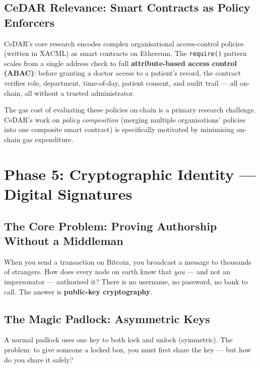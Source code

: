 \documentclass[12pt, a4paper]{article}
\begin{document}
\subsection{CeDAR Relevance: Smart Contracts as Policy Enforcers}

CeDAR's core research encodes complex organisational access-control policies
(written in XACML) as smart contracts on Ethereum. The \texttt{require()} pattern
scales from a single address check to full \textbf{attribute-based access control
(ABAC)}: before granting a doctor access to a patient's record, the contract
verifies role, department, time-of-day, patient consent, and audit trail ---
all on-chain, all without a trusted administrator.

The gas cost of evaluating these policies on-chain is a primary research
challenge. CeDAR's work on \emph{policy composition} (merging multiple
organisations' policies into one composite smart contract) is specifically
motivated by minimising on-chain gas expenditure.

\section{Phase 5: Cryptographic Identity --- Digital Signatures}

\subsection{The Core Problem: Proving Authorship Without a Middleman}

When you send a transaction on Bitcoin, you broadcast a message to thousands of
strangers. How does every node on earth know that \emph{you} --- and not an
impersonator --- authorised it? There is no username, no password, no bank to
call. The answer is \textbf{public-key cryptography}.

\subsection{The Magic Padlock: Asymmetric Keys}

A normal padlock uses one key to both lock and unlock (symmetric). The problem:
to give someone a locked box, you must first share the key --- but how do you
share it safely?
\end{document}
